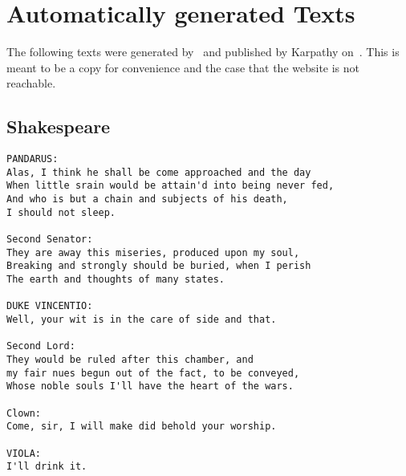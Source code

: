 \documentclass[technote,a4paper,leqno]{IEEEtran}
\begin{document}


\printglossary

\section{Automatically generated Texts}\label{sec:appendix-auto-generated-text}
The following texts were generated by~\cite{charRNNgithub} and published by
Karpathy on~\cite{Karpathy2015}. This is meant to be a copy for convenience
and the case that the website is not reachable.

\subsection{Shakespeare}
\begin{verbatim}
PANDARUS:
Alas, I think he shall be come approached and the day
When little srain would be attain'd into being never fed,
And who is but a chain and subjects of his death,
I should not sleep.

Second Senator:
They are away this miseries, produced upon my soul,
Breaking and strongly should be buried, when I perish
The earth and thoughts of many states.

DUKE VINCENTIO:
Well, your wit is in the care of side and that.

Second Lord:
They would be ruled after this chamber, and
my fair nues begun out of the fact, to be conveyed,
Whose noble souls I'll have the heart of the wars.

Clown:
Come, sir, I will make did behold your worship.

VIOLA:
I'll drink it.
\end{verbatim}
\end{document}
